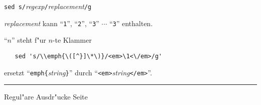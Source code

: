 \begin{slide}{}
\texttt{sed s/}\textsl{regexp}\texttt{/}\textsl{replacement}\texttt{/g}
    
\textsl{replacement} kann  ``\texttt{1}'', ``\texttt{2}'',
``\texttt{3}'' $\cdots$ ``\texttt{3}'' enthalten.
      
      ``\texttt{$n$}'' steht f"ur $n$-te Klammer

      \begin{verbatim}
   sed 's/\\emph{\([^}]\*\)}/<em>\1<\/em>/g' 
      \end{verbatim}
      \vspace{-0.5cm}

      ersetzt ``\texttt{emph\{}\textsl{string}\texttt{\}}'' durch 
      ``\texttt{<em>}\emph{string}\texttt{</em>}''.


\setcounter{page}{1}
\vspace*{\fill}
\tiny \addtocounter{mypage}{1}
\rule{17cm}{1mm}
Regul"are Ausdr"ucke  \hspace*{\fill} Seite 
\end{slide}



